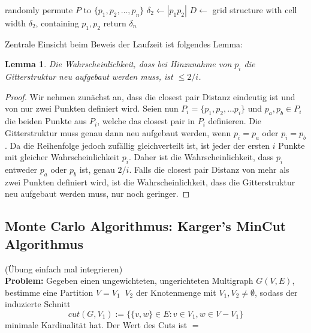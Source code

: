 \documentclass{article}
\newtheorem{lem}[thm]{Lemma}
\begin{document}
\begin{algorithm}
	randomly permute $P$ to $\{p_1, p_2, \dots, p_n\}$\;
	$\delta_2 \gets |p_1p_2|$\;
	$D\gets$ grid structure with cell width $\delta_2$, containing $p_1, p_2$\;
	return $\delta_n$\; 
\end{algorithm}

Zentrale Einsicht beim Beweis der Laufzeit ist folgendes Lemma:
\begin{lem}
	Die Wahrscheinlichkeit, dass bei Hinzunahme von $p_i$ die Gitterstruktur neu aufgebaut werden muss, ist $\leq 2/i$.
\end{lem}
\begin{proof}
Wir nehmen zunächst an, dass die closest pair Distanz eindeutig ist und von nur zwei Punkten definiert wird.
	Seien nun $P_i=\{p_1, p_2, \dots p_i\}$ und $p_a, p_b\in P_i$ die beiden Punkte aus $P_i$, welche das closest pair in $P_i$ definieren.
	Die Gitterstruktur muss genau dann neu aufgebaut werden, wenn $p_i=p_a$ oder $p_i=p_b$. Da die Reihenfolge jedoch zufällig gleichverteilt ist, ist jeder der ersten $i$ Punkte mit gleicher Wahrscheinlichkeit $p_i$.
	Daher ist die Wahrscheinlichkeit, dass $p_i$ entweder $p_a$ oder $p_b$ ist, genau $2/i$. Falls die closest pair Distanz von mehr als zwei Punkten definiert wird, ist die Wahrscheinlichkeit, dass die Gitterstruktur neu
	aufgebaut werden muss, nur noch geringer.
\end{proof}



\subsection{Monte Carlo Algorithmus: Karger's MinCut Algorithmus}
(Übung einfach mal integrieren) \\
{\bf Problem:} Gegeben einen ungewichteten, ungerichteten Multigraph $G(V,E)$, bestimme eine Partition $V=V_1 \mathop{\dot\cup} V_2$ der Knotenmenge mit $V_1,V_2\neq \emptyset$, sodass der induzierte Schnitt $$cut(G, V_1):=\bigl\{\{v,w\}\in E: v\in V_1, w\in V-V_1 \bigr\}$$ minimale Kardinalität hat. Der Wert des Cuts ist $= $
\end{document}
